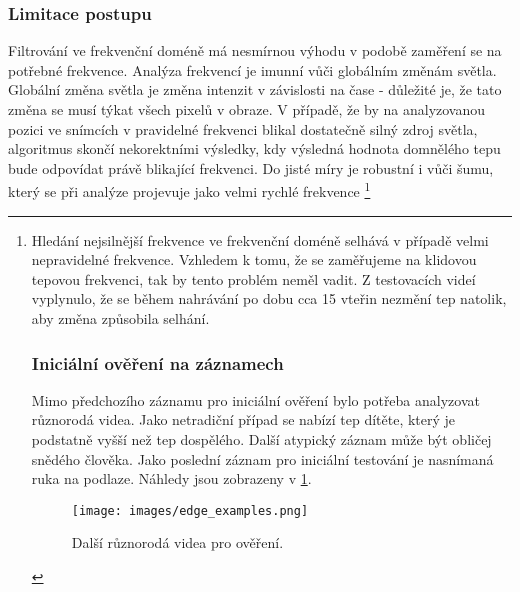 \documentclass[
  digital, %
  table,   %
%
  lof,     %
  lot,     %
]{fithesis3}
\begin{document}
\subsubsection{Limitace postupu}
Filtrování ve frekvenční doméně má nesmírnou výhodu v podobě zaměření se na potřebné frekvence. Analýza frekvencí je imunní vůči globálním změnám světla. Globální změna světla je změna intenzit v závislosti na čase - důležité je, že tato změna se musí týkat všech pixelů v obraze. V případě, že by na analyzovanou pozici ve snímcích v pravidelné frekvenci blikal dostatečně silný zdroj světla, algoritmus skončí nekorektními výsledky, kdy výsledná hodnota domnělého tepu bude odpovídat právě blikající frekvenci. Do jisté míry je robustní i vůči šumu, který se při analýze projevuje jako velmi rychlé frekvence
\footnote{%

Hledání nejsilnější frekvence ve frekvenční doméně selhává v případě velmi nepravidelné frekvence. Vzhledem k tomu, že se zaměřujeme na klidovou tepovou frekvenci, tak by tento problém neměl vadit. Z testovacích videí vyplynulo, že se během nahrávání po dobu cca 15 vteřin nezmění tep natolik, aby změna způsobila selhání.


\subsubsection{Iniciální ověření na záznamech}
Mimo předchozího záznamu pro iniciální ověření bylo potřeba analyzovat různorodá videa. Jako netradiční případ se nabízí tep dítěte, který je podstatně vyšší než tep dospělého. Další atypický záznam může být obličej snědého člověka. Jako poslední záznam pro iniciální testování je nasnímaná ruka na podlaze. Náhledy jsou zobrazeny v \ref{fig:edge_examples}.

\begin{figure}
  \begin{center}
    \texttt{[image: images/edge\_examples.png]}
  \end{center}
  \caption{Další různorodá videa pro ověření.}
  \label{fig:edge_examples}
\end{figure}














}
\end{document}

